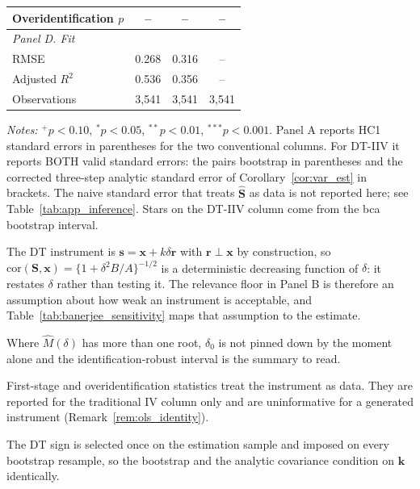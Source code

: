 \begin{table}[htbp]
\begin{threeparttable}
\begin{tabular}{lccc}
\quad Overidentification $p$ & -- & -- & -- \\[3pt]
\midrule
\multicolumn{4}{l}{\emph{Panel D. Fit}} \\
\quad RMSE & 0.268 & 0.316 & -- \\
\quad Adjusted $R^2$ & 0.536 & 0.356 & -- \\
\quad Observations & 3{,}541 & 3{,}541 & 3{,}541 \\
\bottomrule
\end{tabular}
\begin{tablenotes}
\small
\item \textit{Notes:} $^{+}p<0.10$, $^{*}p<0.05$, $^{**}p<0.01$,
$^{***}p<0.001$. Panel A reports HC1 standard errors in parentheses for
the two conventional columns. For DT-IIV it reports BOTH valid standard
errors: the pairs bootstrap in parentheses and the corrected three-step
analytic standard error of Corollary~\ref{cor:var_est} in brackets. The
naive standard error that treats $\widehat{\mathbf S}$ as data is not
reported here; see Table~\ref{tab:app_inference}. Stars on the DT-IIV
column come from the bca bootstrap interval.
\item The DT instrument is $\mathbf s=\mathbf x+k\delta\mathbf r$ with
$\mathbf r\perp\mathbf x$ by construction, so
$\mathrm{cor}(\mathbf S,\mathbf x)=\{1+\delta^2 B/A\}^{-1/2}$ is a
deterministic decreasing function of $\delta$: it restates $\delta$ rather
than testing it. The relevance floor in Panel B is therefore an
assumption about how weak an instrument is acceptable, and
Table~\ref{tab:banerjee_sensitivity} maps that assumption to the estimate.
\item Where $\widehat M(\delta)$ has more than one root, $\delta_0$ is
not pinned down by the moment alone and the identification-robust
interval is the summary to read.
\item First-stage and overidentification statistics treat the instrument
as data. They are reported for the traditional IV column only and are
uninformative for a generated instrument
(Remark~\ref{rem:ols_identity}).
\item The DT sign is selected once on the estimation sample and imposed on
every bootstrap resample, so the bootstrap and the analytic covariance
condition on $\mathbf k$ identically.
\end{tablenotes}
\end{threeparttable}
\end{table}
